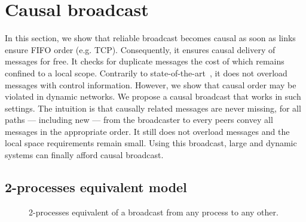 
\section{Causal broadcast}
\label{sec:proposal}

In this section, we show that reliable broadcast becomes causal as soon as links
ensure FIFO order (e.g. TCP). Consequently, it ensures causal delivery of
messages for free. It checks for duplicate messages the cost of which remains
confined to a local scope. Contrarily to
state-of-the-art~\cite{almeida2008interval,birman1987reliable,fidge1988timestamps,hadzilacos1993fault,mattern1989virtual,mostefaoui2017probabilistic,singhal1992efficient},
it does not overload messages with control information.  However, we show that
causal order may be violated in dynamic networks. We propose a causal broadcast
that works in such settings. The intuition is that causally related messages are
never missing, for all paths --- including new --- from the broadcaster to every
peers convey all messages in the appropriate order.  It still does not overload
messages and the local space requirements remain small. Using this broadcast,
large and dynamic systems can finally afford causal broadcast.



\subsection{2-processes equivalent model}

\begin{figure}
  \begin{center}
    
    \caption{\label{fig:2eqmodel}2-processes equivalent of a broadcast from any
      process to any other.}
    \end{center}
\end{figure}

